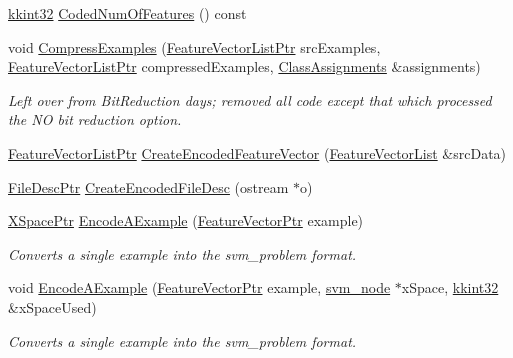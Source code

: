 \begin{DoxyCompactItemize}
\item 
\hyperlink{namespace_k_k_b_a8fa4952cc84fda1de4bec1fbdd8d5b1b}{kkint32} \hyperlink{class_k_k_m_l_l_1_1_feature_encoder_a42b4b25e6c20c3f64cc8a9ca3af0f54c}{Coded\+Num\+Of\+Features} () const 
\item 
void \hyperlink{class_k_k_m_l_l_1_1_feature_encoder_a4cafac6289697a73ce7105793ef0c8d2}{Compress\+Examples} (\hyperlink{namespace_k_k_m_l_l_acf2ba92a3cf03e2b19674b24ff488ef6}{Feature\+Vector\+List\+Ptr} src\+Examples, \hyperlink{namespace_k_k_m_l_l_acf2ba92a3cf03e2b19674b24ff488ef6}{Feature\+Vector\+List\+Ptr} compressed\+Examples, \hyperlink{class_k_k_m_l_l_1_1_class_assignments}{Class\+Assignments} \&assignments)
\begin{DoxyCompactList}\small\item\em Left over from Bit\+Reduction days; removed all code except that which processed the NO bit reduction option. \end{DoxyCompactList}\item 
\hyperlink{namespace_k_k_m_l_l_acf2ba92a3cf03e2b19674b24ff488ef6}{Feature\+Vector\+List\+Ptr} \hyperlink{class_k_k_m_l_l_1_1_feature_encoder_afe8038fbfd17aacd6d3e31aa9345ca43}{Create\+Encoded\+Feature\+Vector} (\hyperlink{class_k_k_m_l_l_1_1_feature_vector_list}{Feature\+Vector\+List} \&src\+Data)
\item 
\hyperlink{namespace_k_k_m_l_l_aa0d0b6ab4ec18868a399b8455b05d914}{File\+Desc\+Ptr} \hyperlink{class_k_k_m_l_l_1_1_feature_encoder_a9a6f0f195cb6856e88caf0aec52dd54a}{Create\+Encoded\+File\+Desc} (ostream $\ast$o)
\item 
\hyperlink{namespace_k_k_m_l_l_abbdd347e3f7ba84af6a5452ef7a0cfef}{X\+Space\+Ptr} \hyperlink{class_k_k_m_l_l_1_1_feature_encoder_af82278dec57d34f3ebcf6ea97cc625d2}{Encode\+A\+Example} (\hyperlink{namespace_k_k_m_l_l_a0c5df3d48f45926fbc4fee04f5e3bc04}{Feature\+Vector\+Ptr} example)
\begin{DoxyCompactList}\small\item\em Converts a single example into the svm\+\_\+problem format. \end{DoxyCompactList}\item 
void \hyperlink{class_k_k_m_l_l_1_1_feature_encoder_af6a88ec1786cbcd70a4eb2ffe7c95c9b}{Encode\+A\+Example} (\hyperlink{namespace_k_k_m_l_l_a0c5df3d48f45926fbc4fee04f5e3bc04}{Feature\+Vector\+Ptr} example, \hyperlink{struct_s_v_m233_1_1svm__node}{svm\+\_\+node} $\ast$x\+Space, \hyperlink{namespace_k_k_b_a8fa4952cc84fda1de4bec1fbdd8d5b1b}{kkint32} \&x\+Space\+Used)
\begin{DoxyCompactList}\small\item\em Converts a single example into the svm\+\_\+problem format. \end{DoxyCompactList}\item 

\end{DoxyCompactItemize}
